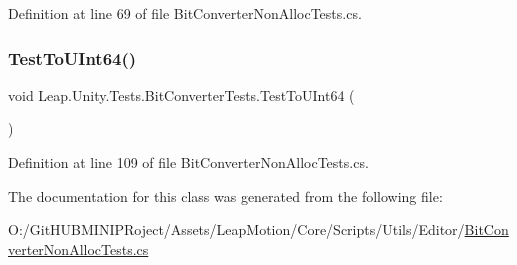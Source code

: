 Definition at line 69 of file Bit\+Converter\+Non\+Alloc\+Tests.\+cs.

\mbox{\label{class_leap_1_1_unity_1_1_tests_1_1_bit_converter_tests_ac10e4316cfdbc3172d9c402bc427833c}} 
\subsubsection{\texorpdfstring{TestToUInt64()}{TestToUInt64()}}
{\footnotesize\ttfamily void Leap.\+Unity.\+Tests.\+Bit\+Converter\+Tests.\+Test\+To\+U\+Int64 (\begin{DoxyParamCaption}{ }\end{DoxyParamCaption})}



Definition at line 109 of file Bit\+Converter\+Non\+Alloc\+Tests.\+cs.



The documentation for this class was generated from the following file\+:\begin{DoxyCompactItemize}
\item 
O\+:/\+Git\+H\+U\+B\+M\+I\+N\+I\+P\+Roject/\+Assets/\+Leap\+Motion/\+Core/\+Scripts/\+Utils/\+Editor/\mbox{\hyperlink{_bit_converter_non_alloc_tests_8cs}{Bit\+Converter\+Non\+Alloc\+Tests.\+cs}}\end{DoxyCompactItemize}
